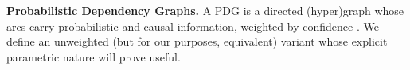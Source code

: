 \documentclass{article} %
\theoremstyle{plain}
\theoremstyle{definition}
\theoremstyle{remark}
\let\cite\citep
\begin{document}
\textbf{Probabilistic Dependency Graphs.}
A PDG is a
   directed
   (hyper)graph
   whose arcs carry
   probabilistic and causal information, weighted by confidence \cite{pdg-aaai}.
We define an unweighted (but for our purposes, equivalent) variant whose explicit parametric nature will prove useful.
\end{document}
